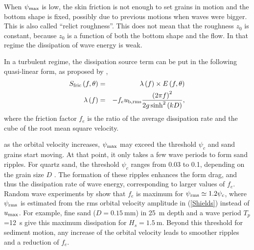 When  $\psi _{{\rm max}}$ is low, the skin friction is not enough to set grains in motion and the bottom shape is fixed, possibly due to 
previous motions when waves were bigger. This is also called ``relict roughness''. This does not mean that the roughness $z_0$ is constant, 
because $z_0$ is a function of both the bottom shape and the flow. 
In that regime the dissipation of wave energy is weak. 

In a turbulent regime, the dissipation source term can be put in the following quasi-linear form, as proposed by \cite{Madsen&al.1990}, 
\begin{eqnarray}
\label{SandLforfriction}
S_{\mathrm{fric}}\left(f,\theta\right) &=&\lambda \left(f\right)
\times E\left(f,\theta\right)
\label{model S} \\
\lambda \left(f\right) &=&-f_{e}u_{\rm b,rms}\frac{\left( 2\pi
f\right) ^{2}}{2g\sinh ^{2}\left( kD\right) },  \label{model lambda}
\end{eqnarray}
where the friction factor  $f_{e}$ is the ratio of the average dissipation rate and the cube of the root mean square velocity. 

as the orbital velocity increases, $\psi _{{\rm max}}$ may exceed the threshold $\psi _c$ and sand grains start moving. 
At that point, it only takes a few wave periods to form sand ripples. For quartz sand, the threshold $\psi _{c}$ ranges from 0.03 to 0.1, depending 
on the grain size $D$ \citep[e.g.][]{Soulsby1997}. The formation of these ripples enhances the form drag, and thus the dissipation 
rate of wave energy, corresponding to larger values of $f_{e}$. Random wave experiments by \cite{Madsen&al.1990} show that 
$f_{e}$ is maximum for  $\psi_{\rm rms} \simeq 1.2\psi _{c}$, where  $\psi_{\rm
rms}$ is estimated from the rms orbital velocity amplitude in  (\ref{Shields}) instead of $u_{{\rm max}}$.
For example, fine sand  ($D=0.15~$mm) in  25~m depth and a wave period $T_{p}$=12~s give this maximum dissipation for 
$H_{s}=1.5~$m. Beyond this threshold for sediment motion, any increase of the orbital velocity 
leads to smoother ripples and a reduction of $f_{e}$.

